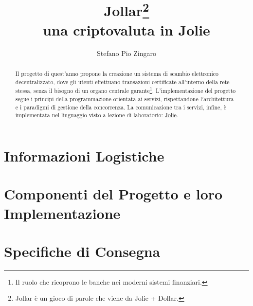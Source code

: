 \documentclass[12pt,a4paper,draft]{article}
\title{Jollar\footnote{Jollar è un gioco di parole che viene da Jolie + Dollar.} \\ una criptovaluta in Jolie}
\author{Stefano Pio Zingaro}
\begin{document}
\maketitle

\begin{abstract}
\noindent Il progetto di quest'anno propone la creazione un sistema di scambio elettronico decentralizzato, dove gli utenti effettuano transazioni certificate all'interno della rete stessa, senza il bisogno di un organo centrale garante\footnote{Il ruolo che ricoprono le banche nei moderni sistemi finanziari.}. L'implementazione del progetto segue i principi della programmazione orientata ai servizi, rispettandone l'architettura e i paradigmi di gestione della concorrenza. La comunicazione tra i servizi, infine, è implementata nel linguaggio visto a lezione di laboratorio: \href{http://jolie-lang.org}{Jolie}.
\end{abstract}

\tableofcontents

\newpage

\section{Informazioni Logistiche}


\newpage

\section{Componenti del Progetto e loro Implementazione}


\newpage

\section{Specifiche di Consegna}

\end{document}
